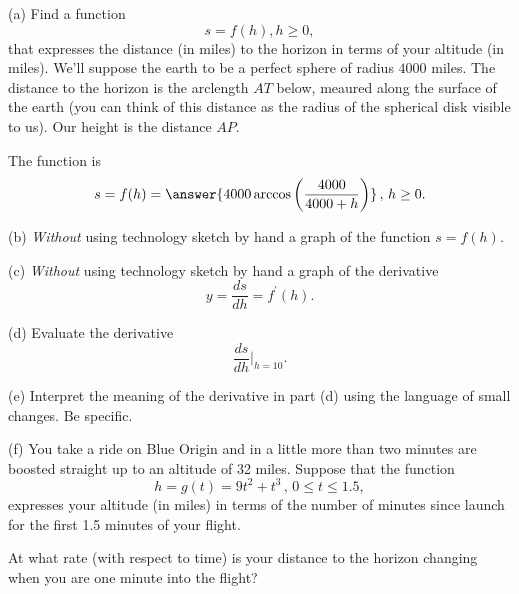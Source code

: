 \documentclass{ximera}
\begin{document}
\begin{question}  \label{Q:LLKDKFG}
(a) Find a function
\[
     s = f(h) , h\geq 0 ,
\]
that expresses the distance (in miles) to the horizon in terms of your altitude (in miles). We'll suppose the earth to be a perfect sphere of radius $4000$ miles. The distance to the horizon is the arclength $AT$ below, meaured along the surface of the earth (you can think of this distance as the radius of the spherical disk visible to us). Our height is the distance $AP$. 
 
The function is 
\[
   s = f(h) = \answer{4000 \arccos\left( \frac{4000}{4000+h} \right) } \, , \, h \geq 0 .
\]

\begin{onlineOnly}
    \begin{center}
\end{center}
\end{onlineOnly}

(b) \emph{Without} using technology sketch by hand a graph of the function $s=f(h)$.

(c) \emph{Without} using technology sketch by hand a graph of the derivative
\[
   y = \frac{ds}{dh} = f^\prime(h) .
\] 

(d) Evaluate the derivative 
\[
      \frac{ds}{dh}\Big|_{h=10} .
\]

(e) Interpret the meaning of the derivative in part (d) using the language of small changes. Be specific.

(f) You take a ride on Blue Origin and in a little more than two minutes are boosted straight up to an altitude of 32 miles. Suppose that the function
\[
      h = g(t) = 9t^2 + t^3 \, , \, 0\leq t \leq 1.5 ,
\]
expresses your altitude (in miles) in terms of the number of minutes since launch for the first 1.5 minutes of your flight.

At what rate (with respect to time) is your distance to the horizon changing when you are one minute into the flight?
\end{question}
\end{document}
